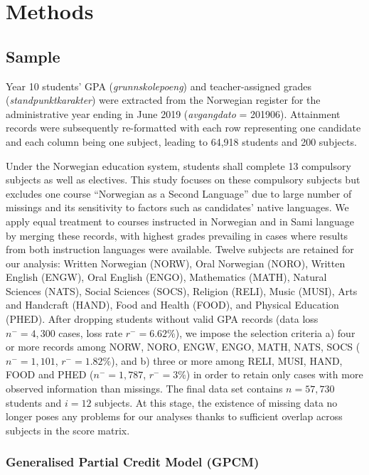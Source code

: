 \section{Methods}

\subsection{Sample}

Year 10 students' GPA (\textit{grunnskolepoeng}) and teacher-assigned grades (\textit{standpunktkarakter}) were extracted from the Norwegian register for the administrative year ending in June 2019 (\textit{avgangdato} = 201906). Attainment records were subsequently re-formatted with each row representing one candidate and each column being one subject, leading to 64,918 students and 200 subjects.

Under the Norwegian education system, students shall complete 13 compulsory subjects as well as electives. This study focuses on these compulsory subjects but excludes one course ``Norwegian as a Second Language'' due to large number of missings and its sensitivity to factors such as candidates' native languages. We apply equal treatment to courses instructed in Norwegian and in Sami language by merging these records, with highest grades prevailing in cases where results from both instruction languages were available. Twelve subjects are retained for our analysis: Written Norwegian (NORW), Oral Norwegian (NORO), Written English (ENGW), Oral English (ENGO), Mathematics (MATH), Natural Sciences (NATS), Social Sciences (SOCS), Religion (RELI), Music (MUSI), Arts and Handcraft (HAND), Food and Health (FOOD), and Physical Education (PHED). After dropping students without valid GPA records (data loss $n^-= 4,300$ cases, loss rate $r^- = 6.62\%$), we impose the selection criteria a) four or more records among NORW, NORO, ENGW, ENGO, MATH, NATS, SOCS ($n^- = 1,101$, $r^- = 1.82\%$), and b) three or more among RELI, MUSI, HAND, FOOD and PHED ($n^-= 1,787$, $r^- = 3\%$) in order to retain only cases with more observed information than missings. The final data set contains $n = 57,730$ students and $i = 12$ subjects. At this stage, the existence of missing data no longer poses any problems for our analyses thanks to sufficient overlap across subjects in the score matrix. %

\subsubsection{Generalised Partial Credit Model (GPCM)}

